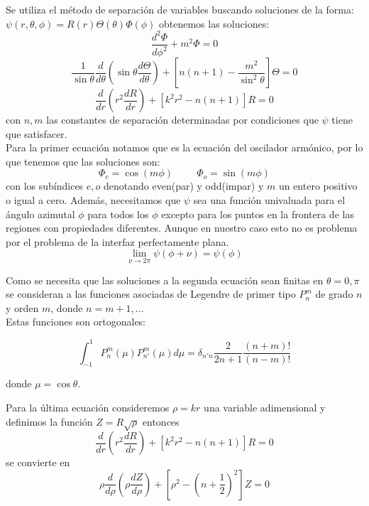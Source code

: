 Se utiliza el método de separación de variables buscando soluciones de la forma:
$\psi(r,\theta,\phi)=R(r)\Theta(\theta)\Phi(\phi)$
obtenemos las soluciones:
\begin{equation}
    \frac{d^2\Phi}{d\phi^2}+m^2\Phi=0
\end{equation}
\begin{equation}
    \frac{1}{\sin\theta}\frac{d}{d\theta}\left(\sin\theta\frac{d\Theta}{d\theta}\right)+\left[n(n+1)-\frac{m^2}{\sin^2\theta}\right]\Theta=0
\end{equation}
\begin{equation}
    \frac{d}{dr}\left(r^2\frac{dR}{dr}\right)+[k^2r^2-n(n+1)]R=0
\end{equation}
con $n,m$ las constantes de separación determinadas por condiciones que $\psi$ tiene que satisfacer.\\

Para la primer ecuación notamos que es la ecuación del oscilador armónico, por lo que tenemos que las soluciones son:
$$\Phi_e=\cos(m\phi)\hspace{1cm}\Phi_o=\sin(m\phi)$$
con los subíndices $e,o$ denotando even(par) y odd(impar) y $m$ un entero positivo o igual a cero. Además, necesitamos que $\psi$ sea una función univaluada para el ángulo azimutal $\phi$ para todos los $\phi$ excepto para los puntos en la frontera de las regiones con propiedades diferentes. Aunque en nuestro caso esto no es problema por el problema de la interfaz perfectamente plana.
\begin{equation*}
    \lim_{\nu\rightarrow 2\pi} \psi(\phi+\nu)=\psi(\phi)
\end{equation*}

Como se necesita que las soluciones a la segunda ecuación sean finitas en $\theta=0,\pi$ se consideran a las funciones asociadas de Legendre de primer tipo $P_n^m$ de grado $n$ y orden $m$, donde $n=m+1,...$\\

Estas funciones son ortogonales:

$$\int_{-1}^{1}P_n^m(\mu)P_{n'}^m(\mu)d\mu=\delta_{n'n}\frac{2}{2n+1}\frac{(n+m)!}{(n-m)!}$$

donde $\mu=\cos\theta$. 

Para la última ecuación consideremos $\rho=kr$ una variable adimensional y definimos la función $Z=R\sqrt{\rho}$ entonces
$$\frac{d}{dr}\left(r^2\frac{dR}{dr}\right)+[k^2r^2-n(n+1)]R=0$$
se convierte en 
$$\rho\frac{d}{d\rho}\left(\rho\frac{dZ}{d\rho}\right)+\left[\rho^2-\left(n+\frac{1}{2}\right)^2\right]Z=0$$

